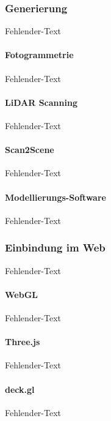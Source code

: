\subsubsection{Generierung}
Fehlender-Text

\paragraph{Fotogrammetrie}
Fehlender-Text

\paragraph{LiDAR Scanning}
Fehlender-Text

\paragraph{Scan2Scene}
Fehlender-Text

\paragraph{Modellierungs-Software}
Fehlender-Text


\subsubsection{Einbindung im Web}
Fehlender-Text

\paragraph{WebGL}
Fehlender-Text

\paragraph{Three.js}
Fehlender-Text

\paragraph{deck.gl}
Fehlender-Text